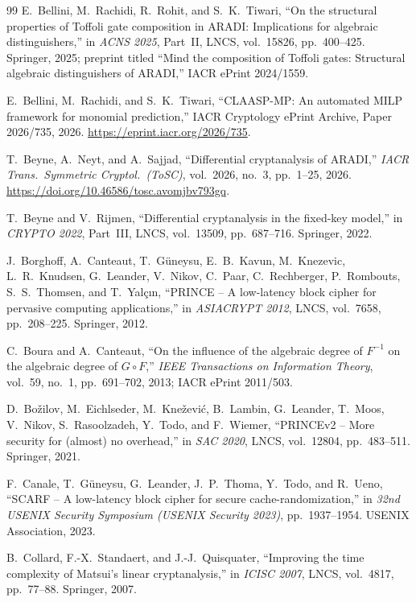 \documentclass[11pt,a4paper]{article}
\theoremstyle{definition}
\theoremstyle{remark}
\begin{document}
\begin{thebibliography}{99}
E.~Bellini, M.~Rachidi, R.~Rohit, and S.~K.~Tiwari,
``On the structural properties of Toffoli gate composition in ARADI: Implications for algebraic distinguishers,''
in \emph{ACNS 2025}, Part~II, LNCS, vol.~15826, pp.~400--425. Springer, 2025; preprint titled ``Mind the composition of Toffoli gates: Structural algebraic distinguishers of ARADI,'' IACR ePrint 2024/1559.

E.~Bellini, M.~Rachidi, and S.~K.~Tiwari,
``CLAASP-MP: An automated MILP framework for monomial prediction,''
IACR Cryptology ePrint Archive, Paper 2026/735, 2026. \url{https://eprint.iacr.org/2026/735}.

T.~Beyne, A.~Neyt, and A.~Sajjad,
``Differential cryptanalysis of ARADI,''
\emph{IACR Trans.\ Symmetric Cryptol.\ (ToSC)}, vol.~2026, no.~3, pp.~1--25, 2026. \url{https://doi.org/10.46586/tosc.avomjbv793gq}.

T.~Beyne and V.~Rijmen,
``Differential cryptanalysis in the fixed-key model,''
in \emph{CRYPTO 2022}, Part~III, LNCS, vol.~13509, pp.~687--716. Springer, 2022.

J.~Borghoff, A.~Canteaut, T.~G\"{u}neysu, E.~B.~Kavun, M.~Knezevic, L.~R.~Knudsen, G.~Leander, V.~Nikov, C.~Paar, C.~Rechberger, P.~Rombouts, S.~S.~Thomsen, and T.~Yal\c{c}{\i}n,
``PRINCE -- A low-latency block cipher for pervasive computing applications,''
in \emph{ASIACRYPT 2012}, LNCS, vol.~7658, pp.~208--225. Springer, 2012.

C.~Boura and A.~Canteaut,
``On the influence of the algebraic degree of $F^{-1}$ on the algebraic degree of $G \circ F$,''
\emph{IEEE Transactions on Information Theory}, vol.~59, no.~1, pp.~691--702, 2013; IACR ePrint 2011/503.

D.~Bo\v{z}ilov, M.~Eichlseder, M.~Kne\v{z}evi\'{c}, B.~Lambin, G.~Leander, T.~Moos, V.~Nikov, S.~Rasoolzadeh, Y.~Todo, and F.~Wiemer,
``PRINCEv2 -- More security for (almost) no overhead,''
in \emph{SAC 2020}, LNCS, vol.~12804, pp.~483--511. Springer, 2021.

F.~Canale, T.~G\"{u}neysu, G.~Leander, J.~P.~Thoma, Y.~Todo, and R.~Ueno,
``SCARF -- A low-latency block cipher for secure cache-randomization,''
in \emph{32nd USENIX Security Symposium (USENIX Security 2023)}, pp.~1937--1954. USENIX Association, 2023.

B.~Collard, F.-X.~Standaert, and J.-J.~Quisquater,
``Improving the time complexity of Matsui's linear cryptanalysis,''
in \emph{ICISC 2007}, LNCS, vol.~4817, pp.~77--88. Springer, 2007.


\end{thebibliography}
\end{document}
